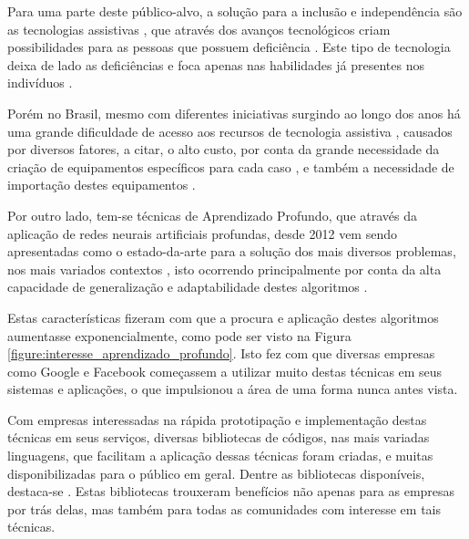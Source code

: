 \par Para uma parte deste público-alvo, a solução para a inclusão e independência são as tecnologias assistivas \cite{ANDRIOLI2017}, que através dos avanços tecnológicos criam possibilidades para as pessoas que possuem deficiência \cite{Bersch2017}. Este tipo de tecnologia deixa de lado as deficiências e foca apenas nas habilidades já presentes nos indivíduos \cite{tve2016}.

\par Porém no Brasil, mesmo com diferentes iniciativas surgindo ao longo dos anos \cite{Bersch2017} há uma grande dificuldade de acesso aos recursos de tecnologia assistiva \cite{ANDRIOLI2017}, causados por diversos fatores, a citar, o alto custo, por conta da grande necessidade da criação de equipamentos específicos para cada caso \cite{tve2016}, e também a necessidade de importação destes equipamentos \cite{ANDRIOLI2017}.

\par Por outro lado, tem-se técnicas de Aprendizado Profundo, que através da aplicação de redes neurais artificiais profundas, desde 2012 vem sendo apresentadas como o estado-da-arte para a solução dos mais diversos problemas, nos mais variados contextos \cite{Ponti2018, forbes2019}, isto ocorrendo principalmente por conta da alta capacidade de generalização e adaptabilidade destes algoritmos \cite{Camila2017, Ponti2018, forbes2019}.

\par Estas características fizeram com que a procura e aplicação destes algoritmos aumentasse exponencialmente, como pode ser visto na Figura \ref{figure:interesse_aprendizado_profundo}. Isto fez com que diversas empresas como Google e Facebook começassem a utilizar muito destas técnicas em seus sistemas e aplicações, o que impulsionou a área de uma forma nunca antes vista.


\par Com empresas interessadas na rápida prototipação e implementação destas técnicas em seus serviços, diversas bibliotecas de códigos, nas mais variadas linguagens, que facilitam a aplicação dessas técnicas foram criadas, e muitas disponibilizadas para o público em geral. Dentre as bibliotecas disponíveis, destaca-se \cite{pytorch2017, tensorflowjs2019, tensorflow2015-whitepaper, chollet2015}. Estas bibliotecas trouxeram benefícios não apenas para as empresas por trás delas, mas também para todas as comunidades com interesse em tais técnicas.

